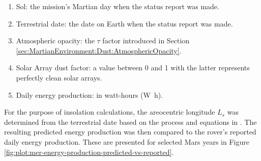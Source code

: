 \begin{enumerate}[label=\textbf{\textcolor{BulletBlue}{(\alph*)}}]
  \item Sol: the mission's Martian day when the status report was made.
  \item Terrestrial date: the date on Earth when the status report was made.
  \item Atmospheric opacity: the $\tau$ factor introduced in Section \ref{sec:MartianEnvironment:Dust:AtmosphericOpacity}.
  \item Solar Array dust factor: a value between 0 and 1 with the latter represents perfectly clean solar arrays.
  \item Daily energy production: in watt-hours (\si{\watt\hour}).
\end{enumerate}

For the purpose of insolation calculations, the areocentric longitude $L_{s}$ was determined from the terrestrial date based on the process and equations in . The resulting predicted energy production was then compared to the rover's reported daily energy production. These are presented for selected Mars years in Figure \ref{fig:plot:mer-energy-production-predicted-vs-reported}.

